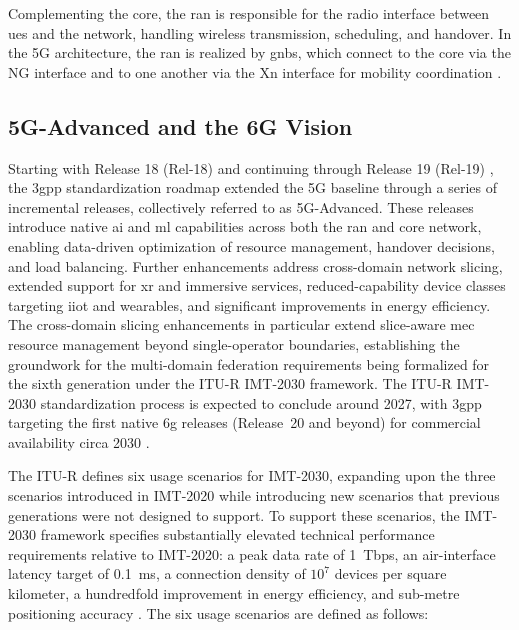 Complementing the core, the \ac{ran} is responsible for the radio interface between \acp{ue} and the network, handling wireless transmission, scheduling, and handover. In the 5G architecture, the \ac{ran} is realized by \acp{gnb}, which connect to the core via the NG interface and to one another via the Xn interface for mobility coordination \cite{3GPPNGRANArchitecturedescription}.

\subsection{5G-Advanced and the 6G Vision}

Starting with Release 18 (Rel-18) \cite{3GPPDigitalcellulartelecommunicationssystemPhase} and continuing through Release 19 (Rel-19) \cite{3GPPDigitalcellulartelecommunicationssystemPhaseRel19}, the \ac{3gpp} standardization roadmap extended the 5G baseline through a series of incremental releases, collectively referred to as 5G-Advanced. These releases introduce native \ac{ai} and \ac{ml} capabilities across both the \ac{ran} and core network, enabling data-driven optimization of resource management, handover decisions, and load balancing. Further enhancements address cross-domain network slicing, extended support for \ac{xr} and immersive services, reduced-capability device classes targeting \ac{iiot} and wearables, and significant improvements in energy efficiency. The cross-domain slicing enhancements in particular extend slice-aware \ac{mec} resource management beyond single-operator boundaries, establishing the groundwork for the multi-domain federation requirements being formalized for the sixth generation under the ITU-R IMT-2030 framework. The ITU-R IMT-2030 standardization process is expected to conclude around 2027, with \ac{3gpp} targeting the first native \ac{6g} releases (Release~20 and beyond) for commercial availability circa 2030 \cite{IMTFrameworkoverallobjectivesfuturedevelopment2023}.

The ITU-R defines six usage scenarios for IMT-2030, expanding upon the three scenarios introduced in IMT-2020 while introducing new scenarios that previous generations were not designed to support. To support these scenarios, the IMT-2030 framework specifies substantially elevated technical performance requirements relative to IMT-2020: a peak data rate of 1~Tbps, an air-interface latency target of 0.1~ms, a connection density of $10^7$ devices per square kilometer, a hundredfold improvement in energy efficiency, and sub-metre positioning accuracy \cite{IMTFrameworkoverallobjectivesfuturedevelopment2023}. The six usage scenarios are defined as follows:

